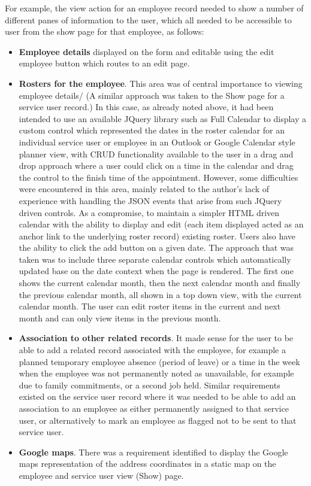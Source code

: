 \documentclass[a4paper,12pt]{article}
\begin{document}
For example, the view action for an employee record needed to show a number of different panes of information to the user, which all needed to be accessible to user from the show page for that employee, as follows:

\begin {itemize}

\item \textbf{Employee details} displayed on the form and editable using the edit employee button which routes to an edit page.
\item \textbf{Rosters for the employee}. This area was of central importance to viewing employee details/ (A similar approach was taken to the Show page for a service user record.) In this case, as already noted above, it had been intended to use an available JQuery library such as Full Calendar to display a custom control which represented the dates in the roster calendar for an individual service user or employee in an Outlook or Google Calendar style planner view, with CRUD functionality available to the user in a drag and drop approach where a user could click on a time in the calendar and drag the control to the finish time of the appointment. However, some difficulties were encountered in this area, mainly related to the author's lack of experience with handling the JSON events that arise from such JQuery driven controls. As a compromise, to maintain a simpler HTML driven calendar with the ability to display and edit (each item displayed acted as an anchor link to the underlying roster record) existing roster. Users also have the ability to click the add button on a given date. The approach that was taken was to include three separate calendar controls which automatically updated base on the date context when the page is rendered. The first one shows the current calendar month, then the next calendar month and finally the previous calendar month, all shown in a top down view, with the current calendar month. The user can edit roster items in the current and next month and can only view items in the previous month.
\item \textbf{Association to other related records}. It made sense for the user to be able to add a related record associated with the employee, for example a planned temporary employee absence (period of leave) or a time in the week when the employee was not permanently noted as unavailable, for example due to family commitments, or a second job held. Similar requirements existed on the service user record where it was needed to be able to add an association to an employee as either permanently assigned to that service user, or alternatively to mark an employee as flagged not to be sent to that service user.
\item \textbf{Google maps}. There was a requirement identified to display the Google maps representation of the address coordinates in a static map on the employee and service user view (Show) page. 
\end {itemize}
\end{document}
